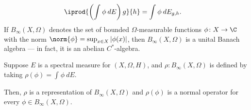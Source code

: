 \documentclass[10pt]{mypackage}
\begin{document}
\begin{align*}
  \iprod{\left( \int_{}^{} \phi\:dE \right)g}{h} &= \int_{}^{} \phi\:dE_{g,h}.
\end{align*}
If $B_{\infty}\left( X,\Omega \right)$ denotes the set of bounded $\Omega$-measurable functions $\phi\colon X\rightarrow \C$ with the norm $\norm{\phi} = \sup_{x\in X} \left\vert \phi(x) \right\vert$, then $B_{\infty}\left( X,\Omega \right)$ is a unital Banach algebra --- in fact, it is an abelian $C^{\ast}$-algebra.
\begin{proposition}
  Suppose $E$ is a spectral measure for $\left( X,\Omega, H \right)$, and $\rho\colon B_{\infty}\left( X,\Omega \right)$ is defined by taking $\rho(\phi) = \int_{}^{} \phi\:dE$.

  Then, $\rho$ is a representation of $B_{\infty}\left( X,\Omega \right)$ and $\rho(\phi)$ is a normal operator for every $\phi\in B_{\infty}\left( X,\Omega \right)$.
\end{proposition}
\end{document}
